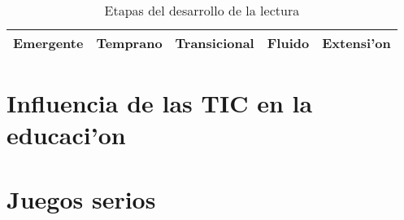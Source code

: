 \begin{table}
	\caption{Etapas del desarrollo de la lectura}
	\centering
	\begin{tabular}{|c|c|c|c|c|}
		\hline
		\textbf{Emergente} & 
		\textbf{Temprano} & 
		\textbf{Transicional} & 
		\textbf{Fluido} & 
		\textbf{Extensi'on} \\
		\hline
	\end{tabular}
	\label{table:etapaslectura}
\end{table}


\section{Influencia de las TIC en la educaci'on}


\section{Juegos serios}




